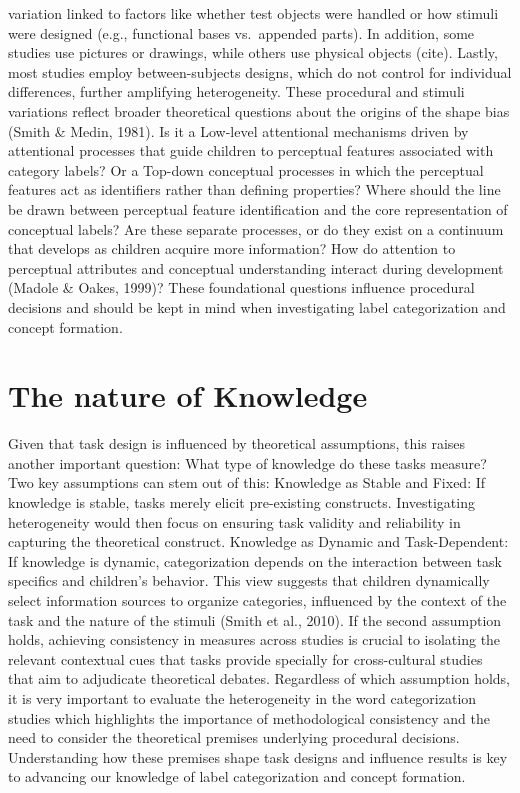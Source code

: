\documentclass[10pt, letterpaper]{article}
\begin{document}
variation linked to factors like whether test objects were handled or
how stimuli were designed (e.g., functional bases vs.~appended parts).
In addition, some studies use pictures or drawings, while others use
physical objects (cite). Lastly, most studies employ between-subjects
designs, which do not control for individual differences, further
amplifying heterogeneity. These procedural and stimuli variations
reflect broader theoretical questions about the origins of the shape
bias (Smith \& Medin, 1981). Is it a Low-level attentional mechanisms
driven by attentional processes that guide children to perceptual
features associated with category labels? Or a Top-down conceptual
processes in which the perceptual features act as identifiers rather
than defining properties? Where should the line be drawn between
perceptual feature identification and the core representation of
conceptual labels? Are these separate processes, or do they exist on a
continuum that develops as children acquire more information? How do
attention to perceptual attributes and conceptual understanding interact
during development (Madole \& Oakes, 1999)? These foundational questions
influence procedural decisions and should be kept in mind when
investigating label categorization and concept formation.

\hypertarget{the-nature-of-knowledge}{%
\section{The nature of Knowledge}\label{the-nature-of-knowledge}}

Given that task design is influenced by theoretical assumptions, this
raises another important question: What type of knowledge do these tasks
measure? Two key assumptions can stem out of this: Knowledge as Stable
and Fixed: If knowledge is stable, tasks merely elicit pre-existing
constructs. Investigating heterogeneity would then focus on ensuring
task validity and reliability in capturing the theoretical construct.
Knowledge as Dynamic and Task-Dependent: If knowledge is dynamic,
categorization depends on the interaction between task specifics and
children's behavior. This view suggests that children dynamically select
information sources to organize categories, influenced by the context of
the task and the nature of the stimuli (Smith et al., 2010). If the
second assumption holds, achieving consistency in measures across
studies is crucial to isolating the relevant contextual cues that tasks
provide specially for cross-cultural studies that aim to adjudicate
theoretical debates. Regardless of which assumption holds, it is very
important to evaluate the heterogeneity in the word categorization
studies which highlights the importance of methodological consistency
and the need to consider the theoretical premises underlying procedural
decisions. Understanding how these premises shape task designs and
influence results is key to advancing our knowledge of label
categorization and concept formation.
\end{document}
